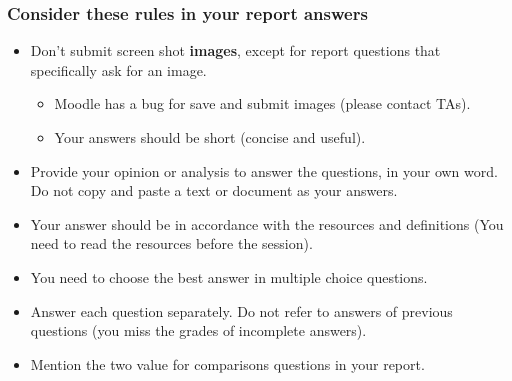 \documentclass[aspectratio=169,15pt]{beamer}
\begin{document}
\begin{frame}
    \frametitle{Consider these rules in your report answers}

    \begin{itemize}
        \item Don’t submit screen shot \textbf{images}, except for report questions that specifically ask for an image.
        \begin{itemize}
            \item Moodle has a bug for save and submit images (please contact TAs).
            \item Your answers should be short (concise and useful).
        \end{itemize}
        \item Provide your opinion or analysis to answer the questions, in your own word. Do not copy and paste a text or document as your answers.
        \item Your answer should be in accordance with the resources and definitions (You need to read the resources before the session).
        \item You need to choose the best answer in multiple choice questions.
        \item Answer each question separately. Do not refer to answers of previous questions  (you miss the grades of incomplete answers).
        \item Mention the two value for comparisons questions in your report.
    \end{itemize}

\end{frame}
\end{document}
